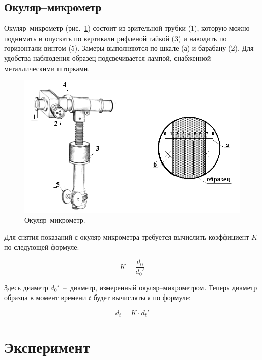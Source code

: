 \documentclass[12pt, a4paper]{article}
\begin{document}
    \subsection{Окуляр–микрометр}
    
    Окуляр–микрометр (рис.~\ref{im2}) состоит из зрительной трубки (1), которую можно поднимать и опускать по вертикали рифленой гайкой (3) и наводить по горизонтали винтом (5). Замеры выполняются по шкале (а) и барабану (2). Для удобства наблюдения образец подсвечивается лампой, снабженной металлическими шторками.
    
    \begin{figure}[h]
        \centering
        \includegraphics[width = 13cm]{image_2.png}
        \caption{Окуляр–микрометр.}
        \label{im2}
    \end{figure}
    
    Для снятия показаний с окуляр-микрометра требуется вычислить коэффициент $K$ по следующей формуле:
    
    \begin{equation}
        K = \frac{d_{0}}{d_{0}'}
        \label{eq6}
    \end{equation}
    
    Здесь диаметр $d_{0}'$~--~диаметр, измеренный окуляр–микрометром. Теперь диаметр образца в момент времени $t$ будет вычисляться по формуле:
    
    \begin{equation}
        d_{t} = K \cdot d_{t}'
        \label{eq7}
    \end{equation}
    
    \newpage
    
    \section{Эксперимент}
    
\end{document}
